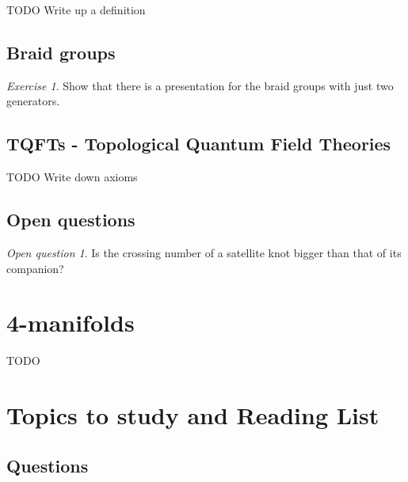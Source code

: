 \documentclass[nobib]{tufte-book} %
\theoremstyle{definition}
\theoremstyle{remark}
\newtheorem{openquestion}{Open question}
\newtheorem{exercise}{Exercise}
\begin{document}
TODO Write up a definition




\section{Braid groups}

\begin{exercise}
	Show that there is a presentation for the braid groups
	with just two generators.
\end{exercise}

\section{TQFTs - Topological Quantum Field Theories}

TODO Write down axioms


\section{Open questions}

\begin{openquestion}
	Is the crossing number of a satellite knot bigger than that of its companion?
\end{openquestion}





\chapter{4-manifolds}

TODO


\chapter{Topics to study and Reading List}

\section{Questions}
\end{document}
